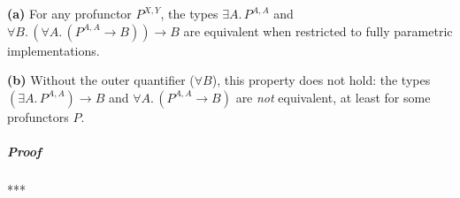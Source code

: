 \textbf{(a)} For any profunctor $P^{X,Y}$, the types $\exists A.\,P^{A,A}$
and $\forall B.\,(\forall A.\,(P^{A,A}\rightarrow B))\rightarrow B$
are equivalent when restricted to fully parametric implementations.

\textbf{(b)} Without the outer quantifier ($\forall B$), this property
does not hold: the types $(\exists A.\,P^{A,A})\rightarrow B$ and
$\forall A.\,(P^{A,A}\rightarrow B)$ are \emph{not} equivalent, at
least for some profunctors $P$.

\subparagraph{Proof}

{*}{*}{*}

\begin{comment}
jatin or the functional programming tutorial the focus of this chapter
is on three type constructions to begin let us consider the interpreter
pattern this is a design pattern where you present your program as
a data structure and you program an interpreter to run your data structure
so as an example consider this domain specific language for complex
numbers it\textsf{'}s a very simple language it has three operations to create
a complex number out of string to multiply complex numbers and to
compute the complex conjugate number if I want to represent this computation
as data in other words not to run it yet but to write down the operations
as data then I could imagine implementing it like this I can implement
some case classes in a disjunction like this so I have a program type
it has three parts of the disjunction which is either a string which
will represent this operation parsing a string into a complex number
multiplication of two complex numbers and computing the complex conjugate
number and then I can imagine that instead of this program I will
have a data structure with nested case classes like this in order
to be able to define such a data structure in my case classrooms should
have these types so for instance multiplication case class will contain
two parts and each can be itself another program so that\textsf{'}s why the
types of the parts of these schemes classes are again the type program
itself so in this way having defined these type parts of the case
class as programs I enable myself to write down arbitrary nested case
classes so this has type program I can use this as part of another
case class like MO or conjugate so in this way I have created a domain-specific
language that expresses computations with complex numbers as data
structures in order to actually compute anything with any complex
numbers I would need to run this program this dsl program as I would

\end{comment}
